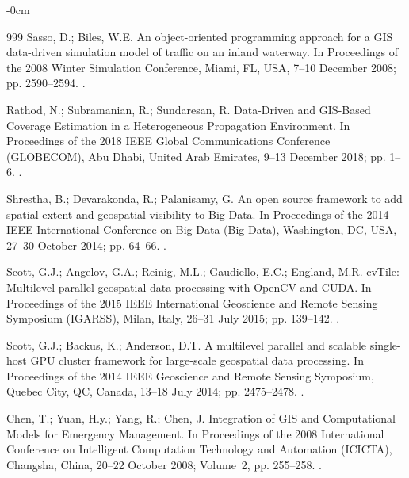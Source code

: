 \documentclass[technologies,article,accept,pdftex,moreauthors]{Definitions/mdpi}
\begin{document}
\begin{adjustwidth}{-\extralength}{0cm}
\begin{thebibliography}{999}
	Sasso, D.; Biles, W.E.
	\newblock An object-oriented programming approach for a GIS data-driven
	simulation model of traffic on an inland waterway.
	\newblock In Proceedings of the 2008 Winter Simulation Conference, Miami, FL, USA, 7--10 December 2008; pp.
	2590--2594. %
	.
	
	Rathod, N.; Subramanian, R.; Sundaresan, R.
	\newblock Data-Driven and GIS-Based Coverage Estimation in a Heterogeneous
	Propagation Environment.
	\newblock In Proceedings of the 2018 IEEE Global Communications Conference
	(GLOBECOM), Abu Dhabi, United Arab Emirates, 9--13 December 2018; pp. 1--6. %
	.
	
	Shrestha, B.; Devarakonda, R.; Palanisamy, G.
	\newblock An open source framework to add spatial extent and geospatial
	visibility to Big Data.
	\newblock In Proceedings of the 2014 IEEE International Conference on Big Data
	(Big Data), Washington, DC, USA, 27--30 October 2014; pp. 64--66. %
	.
	
	Scott, G.J.; Angelov, G.A.; Reinig, M.L.; Gaudiello, E.C.; England, M.R.
	\newblock cvTile: Multilevel parallel geospatial data processing with OpenCV
	and CUDA.
	\newblock In Proceedings of the 2015 IEEE International Geoscience and Remote
	Sensing Symposium (IGARSS), Milan, Italy, 26--31 July 2015; pp. 139--142. %
	.
	
	Scott, G.J.; Backus, K.; Anderson, D.T.
	\newblock A multilevel parallel and scalable single-host GPU cluster framework
	for large-scale geospatial data processing.
	\newblock In Proceedings of the 2014 IEEE Geoscience and Remote Sensing
	Symposium, Quebec City, QC, Canada,  13--18 July 2014; pp. 2475--2478. %
	.
	
	Chen, T.; Yuan, H.y.; Yang, R.; Chen, J.
	\newblock Integration of GIS and Computational Models for Emergency Management.
	\newblock In Proceedings of the 2008 International Conference on Intelligent
	Computation Technology and Automation (ICICTA), Changsha, China, 20--22 October 2008; Volume~2, pp. 255--258. %
	.
	

\end{thebibliography}
\end{adjustwidth}
\end{document}
